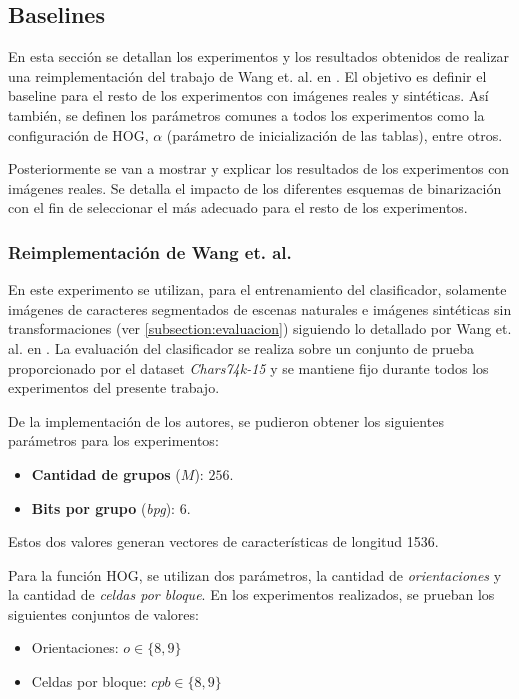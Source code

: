 \subsection{Baselines}
\label{subsection:baseline}

	En esta sección se detallan los experimentos y los resultados obtenidos de realizar una reimplementación del trabajo de Wang et. al. en \cite{wang}. El objetivo es definir el baseline para el resto de los experimentos con imágenes reales y sintéticas. Así también, se definen los parámetros comunes a todos los experimentos como la configuración de HOG, $\alpha$ (parámetro de inicialización de las tablas), entre otros.
	
	Posteriormente se van a mostrar y explicar los resultados de los experimentos con imágenes reales. Se detalla el impacto de los diferentes esquemas de binarización con el fin de seleccionar el más adecuado para el resto de los experimentos.
	
	
\subsubsection{Reimplementación de Wang et. al.}

	En este experimento se utilizan, para el entrenamiento del clasificador, solamente imágenes de caracteres segmentados de escenas naturales e imágenes sintéticas sin transformaciones (ver \ref{subsection:evaluacion}) siguiendo lo detallado por Wang et. al. en \cite{wang}. La evaluación del clasificador se realiza sobre un conjunto de prueba proporcionado por el dataset \textit{Chars74k-15} y se mantiene fijo durante todos los experimentos del presente trabajo.
	
	De la implementación de los autores, se pudieron obtener los siguientes parámetros para los experimentos:
	\begin{itemize}
		\item \textbf{Cantidad de grupos} ($M$): $256$.
		\item \textbf{Bits por grupo} (\textit{bpg}): $6$.
	\end{itemize}
	
	Estos dos valores generan vectores de características de longitud 1536.
	
	Para la función HOG,	 se utilizan dos parámetros, la cantidad de \textit{orientaciones} y la cantidad de \textit{celdas por bloque}. En los experimentos realizados, se prueban los siguientes conjuntos de valores:
	
	\begin{itemize}
		\item Orientaciones: $\textit{o} \in \{8, 9\}$
		\item Celdas por bloque: $\textit{cpb} \in \{8, 9\}$
	\end{itemize}
	

